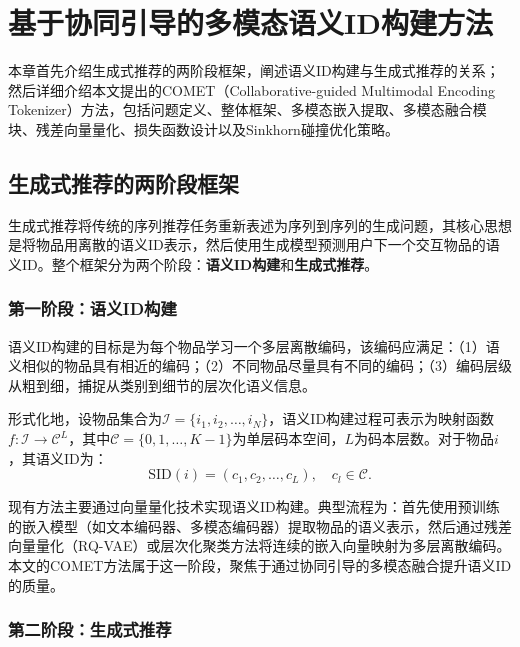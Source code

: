 
\chapter{基于协同引导的多模态语义ID构建方法}

本章首先介绍生成式推荐的两阶段框架，阐述语义ID构建与生成式推荐的关系；然后详细介绍本文提出的COMET（Collaborative-guided Multimodal Encoding Tokenizer）方法，包括问题定义、整体框架、多模态嵌入提取、多模态融合模块、残差向量量化、损失函数设计以及Sinkhorn碰撞优化策略。

\section{生成式推荐的两阶段框架}

生成式推荐将传统的序列推荐任务重新表述为序列到序列的生成问题，其核心思想是将物品用离散的语义ID表示，然后使用生成模型预测用户下一个交互物品的语义ID。整个框架分为两个阶段：\textbf{语义ID构建}和\textbf{生成式推荐}。

\subsection{第一阶段：语义ID构建}

语义ID构建的目标是为每个物品学习一个多层离散编码，该编码应满足：（1）语义相似的物品具有相近的编码；（2）不同物品尽量具有不同的编码；（3）编码层级从粗到细，捕捉从类别到细节的层次化语义信息。

形式化地，设物品集合为$\mathcal{I} = \{i_1, i_2, \ldots, i_N\}$，语义ID构建过程可表示为映射函数$f: \mathcal{I} \to \mathcal{C}^L$，其中$\mathcal{C} = \{0, 1, \ldots, K-1\}$为单层码本空间，$L$为码本层数。对于物品$i$，其语义ID为：
\begin{equation}
  \text{SID}(i) = (c_1, c_2, \ldots, c_L), \quad c_l \in \mathcal{C}.
\end{equation}

现有方法主要通过向量量化技术实现语义ID构建。典型流程为：首先使用预训练的嵌入模型（如文本编码器、多模态编码器）提取物品的语义表示，然后通过残差向量量化（RQ-VAE）或层次化聚类方法将连续的嵌入向量映射为多层离散编码。本文的COMET方法属于这一阶段，聚焦于通过协同引导的多模态融合提升语义ID的质量。

\subsection{第二阶段：生成式推荐}

